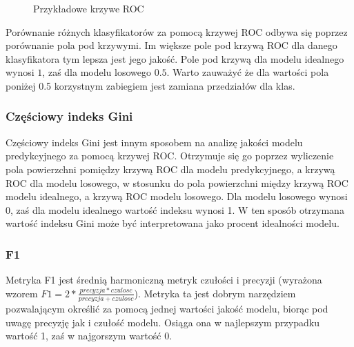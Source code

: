 \documentclass[a4paper, twoside, 11pt, openright]{article}
\begin{document}
\begin{figure}[H]
\caption{Przykładowe krzywe ROC \cite{roccurves} }%
\label{roc}
\end{figure}


Porównanie różnych klasyfikatorów za pomocą krzywej ROC odbywa się poprzez porównanie pola pod krzywymi. Im większe pole pod krzywą ROC dla danego klasyfikatora tym lepsza jest jego jakość. Pole pod krzywą dla modelu idealnego wynosi $1$, zaś dla modelu losowego $0.5$. Warto zauważyć że dla wartości pola poniżej 0.5  korzystnym zabiegiem jest zamiana przedziałów dla klas.


\subsubsection{Częściowy indeks Gini} %


Częściowy indeks Gini jest innym sposobem na analizę jakości modelu predykcyjnego za pomocą krzywej ROC. Otrzymuje się go poprzez wyliczenie pola powierzchni pomiędzy krzywą ROC dla modelu predykcyjnego, a krzywą ROC dla modelu losowego, w stosunku do pola powierzchni między krzywą ROC modelu idealnego, a krzywą ROC modelu losowego. Dla modelu losowego wynosi 0, zaś dla modelu idealnego wartość indeksu wynosi 1. W ten sposób otrzymana wartość indeksu Gini może być interpretowana jako procent idealności modelu.

\subsubsection{F1} %

Metryka F1 jest średnią harmoniczną metryk czułości i precyzji (wyrażona wzorem $F1=2*\frac{precyzja*czulosc}{precyzja+czulosc}$). Metryka ta jest dobrym narzędziem pozwalającym określić za pomocą jednej wartości jakość modelu, biorąc pod uwagę precyzję jak i czułość modelu. Osiąga ona w najlepszym przypadku wartość 1, zaś w najgorszym wartość 0. 



 
\end{document}

